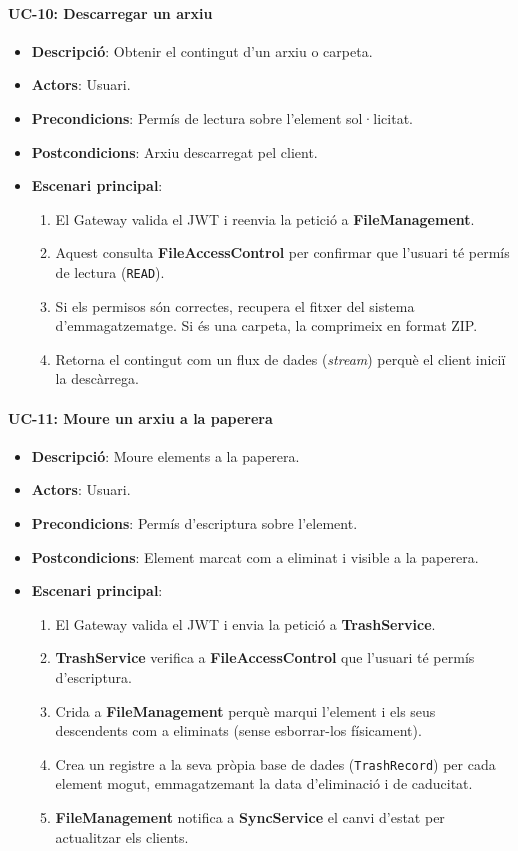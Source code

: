 \paragraph{UC-10: Descarregar un arxiu}
\begin{itemize}
  \item \textbf{Descripció}: Obtenir el contingut d'un arxiu o carpeta.
  \item \textbf{Actors}: Usuari.
  \item \textbf{Precondicions}: Permís de lectura sobre l'element sol·licitat.
  \item \textbf{Postcondicions}: Arxiu descarregat pel client.
  \item \textbf{Escenari principal}:
    \begin{enumerate}
        \item El Gateway valida el JWT i reenvia la petició a \textbf{FileManagement}.
        \item Aquest consulta \textbf{FileAccessControl} per confirmar que l'usuari té permís de lectura (\texttt{READ}).
        \item Si els permisos són correctes, recupera el fitxer del sistema d'emmagatzematge. Si és una carpeta, la comprimeix en format ZIP.
        \item Retorna el contingut com un flux de dades (\emph{stream}) perquè el client iniciï la descàrrega.
    \end{enumerate}
\end{itemize}

\paragraph{UC-11: Moure un arxiu a la paperera}
\begin{itemize}
  \item \textbf{Descripció}: Moure elements a la paperera.
  \item \textbf{Actors}: Usuari.
  \item \textbf{Precondicions}: Permís d'escriptura sobre l'element.
  \item \textbf{Postcondicions}: Element marcat com a eliminat i visible a la paperera.
  \item \textbf{Escenari principal}:
      \begin{enumerate}
        \item El Gateway valida el JWT i envia la petició a \textbf{TrashService}.
        \item \textbf{TrashService} verifica a \textbf{FileAccessControl} que l'usuari té permís d'escriptura.
        \item Crida a \textbf{FileManagement} perquè marqui l'element i els seus descendents com a eliminats (sense esborrar-los físicament).
        \item Crea un registre a la seva pròpia base de dades (\texttt{TrashRecord}) per cada element mogut, emmagatzemant la data d'eliminació i de caducitat.
        \item \textbf{FileManagement} notifica a \textbf{SyncService} el canvi d'estat per actualitzar els clients.
    \end{enumerate}
\end{itemize}

